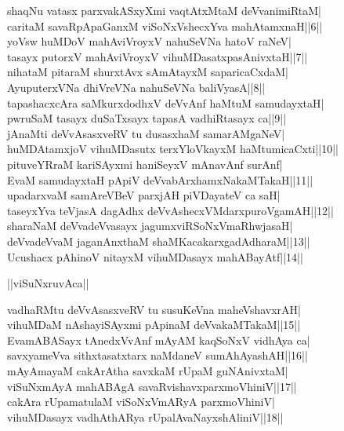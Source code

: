 \documentclass{article}
\begin{document}
shaqNu vatasx parxvakASxyXmi vaqtAtxMtaM deVvanimiRtaM|\\
caritaM savaRpApaGanxM viSoNxVshecxYva mahAtamxnaH||6||\\
yoVsw huMDoV mahAviVroyxV nahuSeVNa hatoV raNeV|\\
tasayx putorxV mahAviVroyxV vihuMDasatxpasAnivxtaH||7||\\
nihataM pitaraM shurxtAvx sAmAtayxM saparicaCxdaM|\\
AyuputerxVNa dhiVreVNa nahuSeVNa baliVyasA||8||\\
tapashacxcAra saMkurxdodhxV deVvAnf haMtuM samudayxtaH|\\
pwruSaM tasayx duSaTxsayx tapasA vadhiRtasayx ca||9||\\
jAnaMti deVvAsasxveRV tu dusasxhaM samarAMgaNeV|\\
huMDAtamxjoV vihuMDasutx terxYloVkayxM haMtumicaCxti||10||\\
pituveYRraM kariSAyxmi haniSeyxV mAnavAnf surAnf|\\
EvaM samudayxtaH pApiV deVvabArxhamxNakaMTakaH||11||\\
upadarxvaM samAreVBeV parxjAH piVDayateV ca saH|\\
taseyxYva teVjasA dagAdhx deVvAshecxVMdarxpuroVgamAH||12||\\
sharaNaM deVvadeVvasayx jagumxviRSoNxVmaRhwjasaH|\\
deVvadeVvaM jaganAnxthaM shaMKacakarxgadAdharaM||13||\\
Ucushacx pAhinoV nitayxM vihuMDasayx mahABayAtf||14||\\

\begin{center}
||viSuNxruvAca||
\end{center}

vadhaRMtu deVvAsasxveRV tu susuKeVna maheVshavxrAH|\\
vihuMDaM nAshayiSAyxmi pApinaM deVvakaMTakaM||15||\\
EvamABASayx tAnedxVvAnf mAyAM kaqSoNxV vidhAya ca|\\
savxyameVva sithxtasatxtarx naMdaneV sumAhAyashAH||16||\\
mAyAmayaM cakArAtha savxkaM rUpaM guNAnivxtaM|\\
viSuNxmAyA mahABAgA savaRvishavxparxmoVhiniV||17||\\
cakAra rUpamatulaM viSoNxVmARyA parxmoVhiniV|\\
vihuMDasayx vadhAthARya rUpalAvaNayxshAliniV||18||\\
\end{document}
